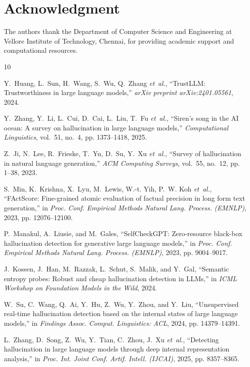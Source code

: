 \documentclass[journal]{IEEEtran}
\begin{document}
\section*{Acknowledgment}
The authors thank the Department of Computer Science and Engineering at Vellore Institute of Technology, Chennai, for providing academic support and computational resources.


\begin{thebibliography}{10}

Y.~Huang, L.~Sun, H.~Wang, S.~Wu, Q.~Zhang \emph{et~al.}, ``TrustLLM: Trustworthiness in large language models,'' \emph{arXiv preprint arXiv:2401.05561}, 2024.

Y.~Zhang, Y.~Li, L.~Cui, D.~Cai, L.~Liu, T.~Fu \emph{et~al.}, ``Siren's song in the AI ocean: A survey on hallucination in large language models,'' \emph{Computational Linguistics}, vol.~51, no.~4, pp. 1373--1418, 2025.

Z.~Ji, N.~Lee, R.~Frieske, T.~Yu, D.~Su, Y.~Xu \emph{et~al.}, ``Survey of hallucination in natural language generation,'' \emph{ACM Computing Surveys}, vol.~55, no.~12, pp. 1--38, 2023.

S.~Min, K.~Krishna, X.~Lyu, M.~Lewis, W.-t. Yih, P.~W. Koh \emph{et~al.}, ``FActScore: Fine-grained atomic evaluation of factual precision in long form text generation,'' in \emph{Proc. Conf. Empirical Methods Natural Lang. Process. (EMNLP)}, 2023, pp. 12076--12100.

P.~Manakul, A.~Liusie, and M.~Gales, ``SelfCheckGPT: Zero-resource black-box hallucination detection for generative large language models,'' in \emph{Proc. Conf. Empirical Methods Natural Lang. Process. (EMNLP)}, 2023, pp. 9004--9017.

J.~Kossen, J.~Han, M.~Razzak, L.~Schut, S.~Malik, and Y.~Gal, ``Semantic entropy probes: Robust and cheap hallucination detection in LLMs,'' in \emph{ICML Workshop on Foundation Models in the Wild}, 2024.

W.~Su, C.~Wang, Q.~Ai, Y.~Hu, Z.~Wu, Y.~Zhou, and Y.~Liu, ``Unsupervised real-time hallucination detection based on the internal states of large language models,'' in \emph{Findings Assoc. Comput. Linguistics: ACL}, 2024, pp. 14379--14391.

L.~Zhang, D.~Song, Z.~Wu, Y.~Tian, C.~Zhou, J.~Xu \emph{et~al.}, ``Detecting hallucination in large language models through deep internal representation analysis,'' in \emph{Proc. Int. Joint Conf. Artif. Intell. (IJCAI)}, 2025, pp. 8357--8365.


\end{thebibliography}
\end{document}
